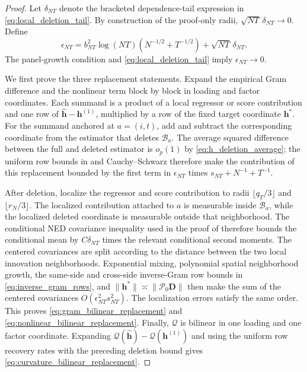 \documentclass[11pt]{article}
\numberwithin{equation}{section}
\theoremstyle{remark}
\newcommand{\bD}{\bm D}
\newcommand{\calP}{\mathcal P}
\begin{document}
\begin{proof}
Let $\delta_{NT}$ denote the bracketed dependence-tail expression in
\eqref{eq:local_deletion_tail}. By construction of the proof-only radii,
$\sqrt{NT}\,\delta_{NT}\to0$. Define
$$
\epsilon_{NT}
=
b_{NT}^2\log(NT)
\left(
N^{-1/2}+T^{-1/2}
\right)
+
\sqrt{NT}\,\delta_{NT}.
$$
The panel-growth condition and \eqref{eq:local_deletion_tail} imply
$\epsilon_{NT}\to0$.

We first prove the three replacement statements. Expand the empirical Gram
difference and the nonlinear term block by block in loading and factor
coordinates. Each summand is a product of a local regressor or score
contribution and one row of $\widehat{\bm h}-\bm h^{(1)}$, multiplied by a
row of the fixed target coordinate $\bm h^*$. For the summand anchored at
$a=(i,t)$, add and subtract the corresponding coordinate from the estimator
that deletes $\mathcal B_a$. The average squared difference between the
full and deleted estimator is $o_p(1)$ by
\eqref{eq:h_deletion_average}; the uniform row bounds in
 and Cauchy--Schwarz therefore make the contribution of
this replacement bounded by the first term in $\epsilon_{NT}$ times
$s_{NT}+N^{-1}+T^{-1}$.

After deletion, localize the regressor and score contribution to radii
$\lfloor q_T/3\rfloor$ and $\lfloor r_N/3\rfloor$. The localized
contribution attached to $a$ is measurable inside $\mathcal B_a$, while
the localized deleted coordinate is measurable outside that neighborhood.
The conditional NED covariance inequality used in the proof of
 therefore bounds the conditional mean by
$C\delta_{NT}$ times the relevant conditional second moments. The centered
covariances are split according to the distance between the two local
innovation neighborhoods. Exponential mixing, polynomial spatial
neighborhood growth, the same-side and cross-side inverse-Gram row bounds
in \eqref{eq:inverse_gram_rows}, and
$\|\bm h^*\|\asymp\|\calP_0\bD\|$ then make the sum of the centered
covariances $O(\epsilon_{NT}^2s_{NT}^2)$. The localization errors satisfy
the same order. This proves
\eqref{eq:gram_bilinear_replacement} and
\eqref{eq:nonlinear_bilinear_replacement}. Finally,
$\mathcal Q$ is bilinear in one loading and one factor coordinate.
Expanding
$\mathcal Q(\widehat{\bm h})-\mathcal Q(\bm h^{(1)})$ and using the
uniform row recovery rates with the preceding deletion bound gives
\eqref{eq:curvature_bilinear_replacement}.


\end{proof}
\end{document}
